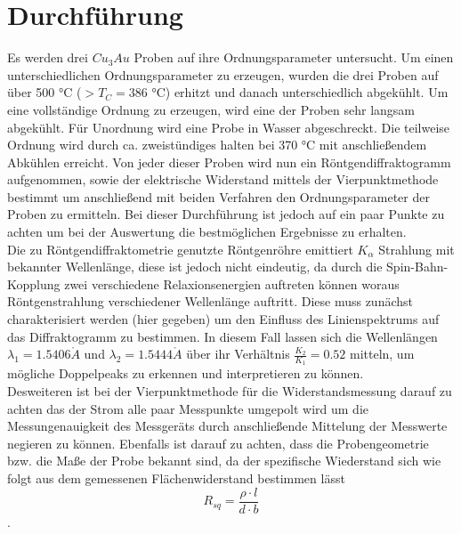 \section{Durchführung}
    Es werden drei $Cu_3Au$ Proben auf ihre Ordnungsparameter untersucht. Um einen unterschiedlichen
    Ordnungsparameter zu erzeugen, wurden die drei Proben auf über 500 °C ($>T_C = 386 $ °C) erhitzt
    und danach unterschiedlich abgekühlt. Um eine vollständige Ordnung zu erzeugen, wird eine der
    Proben sehr langsam abgekühlt. Für Unordnung wird eine Probe in Wasser abgeschreckt.
    Die teilweise Ordnung wird durch ca. zweistündiges halten bei 370 °C mit anschließendem Abkühlen
    erreicht. Von jeder dieser Proben wird nun ein Röntgendiffraktogramm aufgenommen,
    sowie der elektrische Widerstand mittels der Vierpunktmethode bestimmt um anschließend mit beiden Verfahren den
    Ordnungsparameter der Proben zu ermitteln.
    Bei dieser Durchführung ist jedoch auf ein paar Punkte zu achten um bei der Auswertung die bestmöglichen
    Ergebnisse zu erhalten.\\
    Die zu Röntgendiffraktometrie genutzte Röntgenröhre emittiert $K_{\alpha}$ Strahlung mit bekannter
    Wellenlänge, diese ist jedoch nicht eindeutig, da durch die Spin-Bahn-Kopplung zwei verschiedene
    Relaxionsenergien auftreten können woraus Röntgenstrahlung verschiedener Wellenlänge auftritt.
    Diese muss zunächst charakterisiert werden (hier gegeben) um den Einfluss des Linienspektrums auf
    das Diffraktogramm zu bestimmen. In diesem Fall lassen sich die Wellenlängen $\lambda_1 = 1.5406\mathring{A}$
    und $\lambda_2 = 1.5444\mathring{A}$ über ihr Verhältnis $\frac{K_2}{K_1} = 0.52$ mitteln, um mögliche Doppelpeaks
    zu erkennen und interpretieren zu können.\\
    Desweiteren ist bei der Vierpunktmethode für die Widerstandsmessung darauf zu achten das der Strom alle paar
    Messpunkte umgepolt wird um die Messungenauigkeit des Messgeräts durch anschließende Mittelung der 
    Messwerte negieren zu können. Ebenfalls ist darauf zu achten, dass die Probengeometrie bzw. die Maße
    der Probe bekannt sind, da der spezifische Wiederstand sich wie folgt aus dem gemessenen Flächenwiderstand
    bestimmen lässt
    \begin{equation}
        R_{sq} = \frac{\rho \cdot l}{d\cdot b}
    \end{equation}.